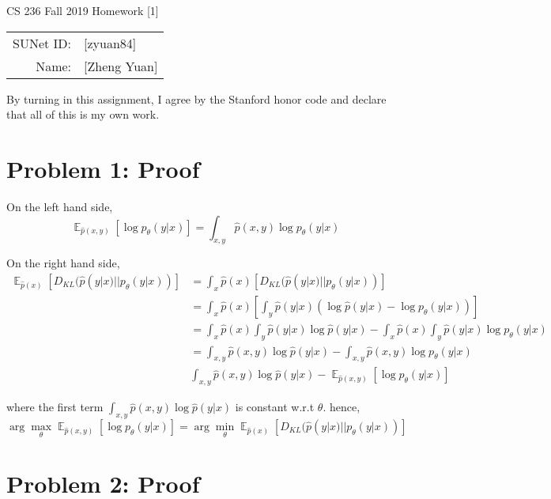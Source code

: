 \documentclass[12pt]{article}
\DeclareMathOperator{\E}{\mathbb{E}}
\begin{document}
\begin{center}
{\Large CS 236 Fall 2019 Homework [1]}

\begin{tabular}{rl}
SUNet ID: & [zyuan84] \\
Name: & [Zheng Yuan] \\
\end{tabular}
\end{center}

By turning in this assignment, I agree by the Stanford honor code and declare
that all of this is my own work.

\section*{Problem 1: Proof}

On the left hand side,
 \begin{equation}
 \E_{\hat p(x, y)} [\log{p_\theta(y|x)}] = \int_{x,y}{\hat p(x, y)}{\log{p_\theta(y|x)}}
 \end{equation}

On the right hand side,
 \begin{equation}
 \begin{split}
 \E_{\hat p(x)} [D_{KL}(\hat p(y|x) || p_\theta(y|x))] &= \int_{x}{\hat p(x)}[D_{KL}(\hat p(y|x) || p_\theta(y|x))] \\
  &= \int_{x}{\hat p(x)}[\int_{y}{\hat p(y|x) (\log{\hat p(y|x)} - \log{p_\theta(y|x)})} ]  \\
  &= \int_{x}{\hat p(x)}  \int_{y}{\hat p(y|x)\log{\hat p(y|x)}} - \int_{x}{\hat p(x)}  \int_{y}{\hat p(y|x)\log{p_\theta(y|x)}} \\
  & = \int_{x, y} {\hat p (x, y) \log \hat p(y|x)} - \int_{x, y} {\hat p (x, y) \log p_{\theta}(y|x)} \\
  & \int_{x, y} {\hat p (x, y) \log \hat p(y|x)} - \E_{\hat p(x, y)} [\log{p_\theta(y|x)}] 
 \end{split}
 \end{equation}
 
 where  the first term $\int_{x, y} {\hat p (x, y) \log \hat p(y|x)}$ is constant w.r.t $\theta$.
 hence, 
  \begin{equation}
 \arg \max_{\theta} \E_{\hat p(x, y)} [\log{p_\theta(y|x)}] = \arg \min_{\theta} \E_{\hat p(x)} [D_{KL}(\hat p(y|x) || p_\theta(y|x))]
 \end{equation}

\section*{Problem 2: Proof}
\end{document}
